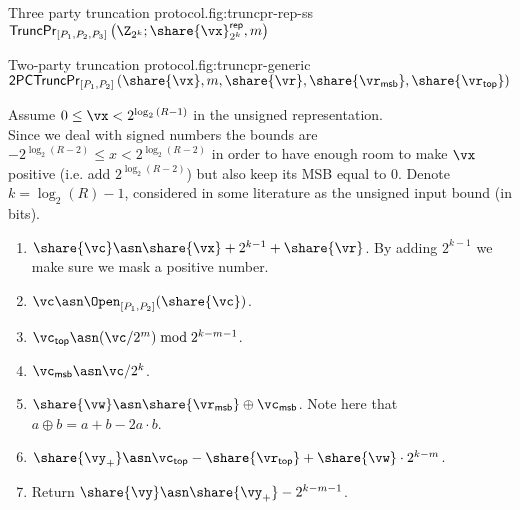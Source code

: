 \begin{Boxfig}{Three party truncation protocol.}{fig:truncpr-rep-ss}{$\mathsf{TruncPr}_{[P_1, P_2, P_3]} \left(\Z_{2^k}; \share{\vx}^{\mathsf{rep}}_{2^k}, m \right)$}
\begin{enumerate}
\end{enumerate}

\end{Boxfig}

\begin{Boxfig}{Two-party truncation protocol.}{fig:truncpr-generic}
  {$\mathsf{2PCTruncPr}_{[P_1, P_2]} \left( \share{\vx}, m, \share{\vr},
  \share{\vr_{\mathsf{msb}}}, \share{\vr_{\mathsf{top}}} \right)$}

  Assume $0 \leq \vx < 2^{\log_2{(R - 1})}$ in the unsigned representation. \\
  Since we deal with signed numbers the bounds are $-2^{\log_2{(R - 2)}} \leq x <
  2^{\log_2{(R - 2)}}$ in order to have enough room to make $\vx$ positive (i.e.
  add $2^{\log_2{(R-2)}}$) but also keep its MSB equal to $0$.  Denote $k =
  \log_2(R) - 1$, considered in some literature as the unsigned input bound (in bits).
  \begin{enumerate}
  \item $\share{\vc} \asn \share{\vx} + 2^{k-1} + \share{\vr}$. By adding $2^{k-1}$ we make sure we mask a positive number.
  \item $\vc \asn \Open_{[P_1, P_2]}(\share{\vc})$.
  \item $\vc_{\mathsf{top}} \asn (\vc / 2^m) \bmod 2^{k-m-1}$.

  \item $\vc_{\mathsf{msb}} \asn \vc / 2^{k}$.
  \item $\share{\vw} \asn \share{\vr_{\mathsf{msb}}} \oplus \vc_{\mathsf{msb}}$. Note here that $a \oplus b = a + b - 2a\cdot b$.
  \item $\share{\vy_+} \asn \vc_{\mathsf{top}} - \share{\vr_{\mathsf{top}}} + \share{\vw}  \cdot 2^{k-m}$.
  \item Return $\share{\vy} \asn \share{\vy_+} - 2^{k-m-1}$.
\end{enumerate}

\end{Boxfig}


